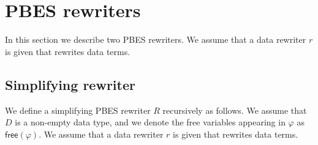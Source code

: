                       

\section{PBES rewriters}

In this section we describe two PBES rewriters. We assume that a data
rewriter $r$ is given that rewrites data terms.

\subsection{Simplifying rewriter}

We define a simplifying PBES rewriter $R$ recursively as follows. We assume
that $D$ is a non-empty data type, and we denote the free variables
appearing in $\varphi $ as $\mathsf{free}(\varphi )$. We assume that a data
rewriter $r$ is given that rewrites data terms.%

